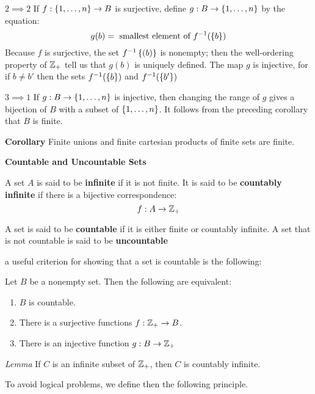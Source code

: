 $ 2 \implies 2 $ If $f : \left\lbrace 1, \ldots, n \right\rbrace \rightarrow B$ is surjective, define $ g : B \rightarrow \left\lbrace 1, \ldots,n \right\rbrace $ by the equation:
\[ g(b) = \textrm{ smallest element of } f^{-1}(\left\lbrace b \right\rbrace) \]
Because $f$ is surjective, the set $ f^{-1}\left\lbrace (b) \right\rbrace $ is nonempty; then the well-ordering property of $ \mathbb{Z}_+ $ tell us that $ g(b) $ is uniquely defined. The map $g$ is injective, for if $ b \neq b'$ then the sets $ f^{-1}(\left\lbrace b \right\rbrace) $  and $ f^{-1}(\left\lbrace b' \right\rbrace) $

$ 3 \implies 1 $ If $ g : B \rightarrow \left\lbrace 1, \ldots, n \right\rbrace $ is injective, then changing the range of $g$ gives a bijection of $B$ with a subset of $ \left\lbrace 1, \ldots, n \right\rbrace $. It follows from the preceding corollary that $B$ is finite. \qedsymbol

\textbf{Corollary} Finite unions and finite cartesian products of finite sets are finite.


\textbf{\LARGE Countable and Uncountable Sets}

\begin{define}
	A set $A$ is said to be \textbf{infinite} if it is not finite. It is said to be \textbf{countably infinite} if there is a bijective correspondence:
	\[ f : A \rightarrow \mathbb{Z}_+ \]
	
\end{define}

\begin{define}
	A set is said to be \textbf{countable} if it is either finite or countably infinite. A set that is not countable is said to be \textbf{uncountable}
\end{define}

a useful criterion for showing that a set is countable is the following:

\begin{thm} \label{countable criterion}
	Let $B$ be a nonempty set. Then the following are equivalent:
	\begin{enumerate}
		\item $B$  is countable.
		\item There is a surjective functions $ f : \mathbb{Z}_+ \rightarrow B $.
		\item There is an injective function $ g : B \rightarrow \mathbb{Z}_+ $
	\end{enumerate}
\end{thm}

\textit{Lemma } If $C$ is an infinite subset of $ \mathbb{Z}_+ $, then $C$ is countably infinite.

To avoid logical problems, we define then the following principle.

